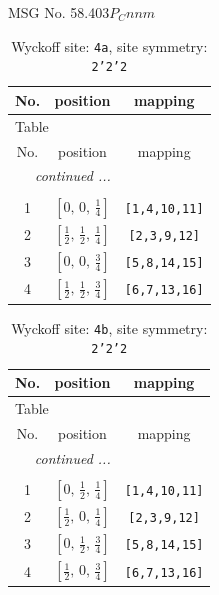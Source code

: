 \documentclass[fleqn,8pt]{jsarticle}
\begin{document}
\setcounter{MaxMatrixCols}{32}

\renewcommand{\tablename}{Table~}
\renewcommand{\figurename}{Figure~}
\begin{center}
\LARGE
MSG No. 58.403\quad$P_{C}nnm$
\end{center}
\renewcommand{\arraystretch}{1.2}
\begin{longtable}{ccc}
\caption{Wyckoff site: {\tt 4a}, site symmetry: {\tt 2'2'2}}
 \\
 \hline \hline
No. & position & mapping \\ \hline \endfirsthead

\multicolumn{2}{l}{\tablename\ \thetable{}} \\
 \hline \hline
No. & position & mapping \\ \hline \endhead

 \hline \hline
\multicolumn{2}{r}{\footnotesize\it continued ...} \\ \endfoot

 \hline \hline
\multicolumn{2}{r}{} \\ \endlastfoot

1 & $\left[ 0,\, 0,\, \frac{1}{4} \right]$ & {\tt [1,4,10,11]} \\ \hline
2 & $\left[ \frac{1}{2},\, \frac{1}{2},\, \frac{1}{4} \right]$ & {\tt [2,3,9,12]} \\ \hline
3 & $\left[ 0,\, 0,\, \frac{3}{4} \right]$ & {\tt [5,8,14,15]} \\ \hline
4 & $\left[ \frac{1}{2},\, \frac{1}{2},\, \frac{3}{4} \right]$ & {\tt [6,7,13,16]} \\
\end{longtable}
\renewcommand{\arraystretch}{1.2}
\begin{longtable}{ccc}
\caption{Wyckoff site: {\tt 4b}, site symmetry: {\tt 2'2'2}}
 \\
 \hline \hline
No. & position & mapping \\ \hline \endfirsthead

\multicolumn{2}{l}{\tablename\ \thetable{}} \\
 \hline \hline
No. & position & mapping \\ \hline \endhead

 \hline \hline
\multicolumn{2}{r}{\footnotesize\it continued ...} \\ \endfoot

 \hline \hline
\multicolumn{2}{r}{} \\ \endlastfoot

1 & $\left[ 0,\, \frac{1}{2},\, \frac{1}{4} \right]$ & {\tt [1,4,10,11]} \\ \hline
2 & $\left[ \frac{1}{2},\, 0,\, \frac{1}{4} \right]$ & {\tt [2,3,9,12]} \\ \hline
3 & $\left[ 0,\, \frac{1}{2},\, \frac{3}{4} \right]$ & {\tt [5,8,14,15]} \\ \hline
4 & $\left[ \frac{1}{2},\, 0,\, \frac{3}{4} \right]$ & {\tt [6,7,13,16]} \\
\end{longtable}
\end{document}
